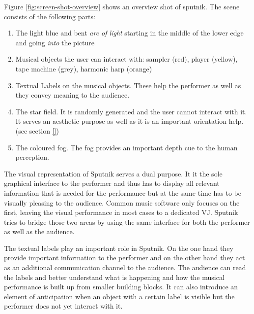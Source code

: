 \documentclass[10pt,a4paper]{scrartcl}
\begin{document}
Figure \ref{fig:screen-shot-overview} shows an overview shot of sputnik. The scene consists of the following parts:
\begin{enumerate}
\item The light blue and bent \emph{arc of light} starting in the middle of the lower edge and going \emph{into} the picture
\item Musical objects the user can interact with: sampler (red), player (yellow), tape machine (grey), harmonic harp (orange)
\item Textual Labels on the musical objects. These help the performer as well as they convey meaning to the audience.
\item The star field. It is randomly generated and the user cannot interact with it. It serves an aesthetic  purpose as well as it is an important orientation help. (see section \ref{})
\item The coloured fog. The fog provides an important depth cue to the human perception. 
\end{enumerate}


The visual representation of Sputnik serves a dual purpose. It it the sole graphical interface to the performer and thus has to display all relevant information that is needed for the performance but at the same time has to be visually pleasing to the audience. Common music software only focuses on the first, leaving the visual performance in most cases to a dedicated VJ. Sputnik tries to bridge those two areas by using the same interface for both the performer as well as the audience.

The textual labels play an important role in Sputnik. On the one hand they provide important information to the performer and on the other hand they act as an additional communication channel to the audience. The audience can read the labels and better understand what is happening and how the musical performance is built up from smaller building blocks. It can also introduce an element of anticipation when an object with a certain label is visible but the performer does not yet interact with it.
\end{document}
